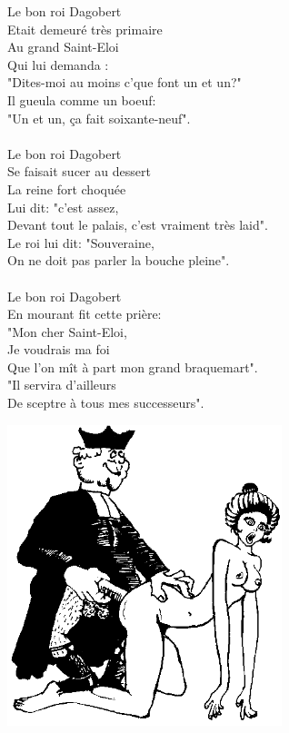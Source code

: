 \breakpage
Le bon roi Dagobert
\\Etait demeuré très primaire
\\Au grand Saint-Eloi
\\Qui lui demanda :
\\"Dites-moi au moins c'que font un et un?"
\\Il gueula comme un boeuf:
\\"Un et un, ça fait soixante-neuf".
\\\\Le bon roi Dagobert
\\Se faisait sucer au dessert
\\La reine fort choquée
\\Lui dit: "c'est assez,
\\Devant tout le palais, c'est vraiment très laid".
\\Le roi lui dit: "Souveraine,
\\On ne doit pas parler la bouche pleine".
\\\\Le bon roi Dagobert
\\En mourant fit cette prière:
\\"Mon cher Saint-Eloi,
\\Je voudrais ma foi
\\Que l'on mît à part mon grand braquemart".
\\"Il servira d'ailleurs
\\De sceptre à tous mes successeurs".
\begin{center}
   \includegraphics[width=0.6\textwidth]{images/dagobert.png}
 \end{center}
\breakpage